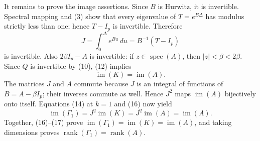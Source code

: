 It remains to prove the image assertions.  Since \(B\) is Hurwitz, it is invertible.  Spectral mapping and (3) show that every eigenvalue of \(T=e^{B\Delta}\) has modulus strictly less than one; hence \(T-I_p\) is invertible.  Therefore
\[
 J=\int_0^\Delta e^{Bu}\,du=B^{-1}(T-I_p)
\tag{15}
\]
is invertible.  Also \(2\beta I_p-A\) is invertible: if \(z\in\operatorname{spec}(A)\), then \(|z|<\beta<2\beta\).  Since \(Q\) is invertible by (10), (12) implies
\[
 \operatorname{im}(K)=\operatorname{im}(A).
\tag{16}
\]
The matrices \(J\) and \(A\) commute because \(J\) is an integral of functions of \(B=A-\beta I_p\); their inverses commute as well.  Hence \(J^2\) maps \(\operatorname{im}(A)\) bijectively onto itself.  Equations (14) at \(k=1\) and (16) now yield
\[
 \operatorname{im}(\Gamma_1)=J^2\operatorname{im}(K)
 =J^2\operatorname{im}(A)=\operatorname{im}(A).
\tag{17}
\]
Together, (16)--(17) prove \(\operatorname{im}(\Gamma_1)=\operatorname{im}(K)=\operatorname{im}(A)\), and taking dimensions proves \(\operatorname{rank}(\Gamma_1)=\operatorname{rank}(A)\).